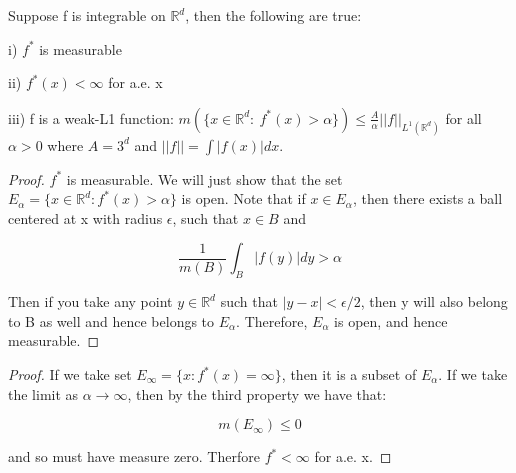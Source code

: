 \documentclass[class=article, crop=false]{standalone}
\begin{document}
			\begin{theorem} 
			\label{thm:properties_hardylittlewood_maximal_function}
				Suppose f is integrable on $\mathbb{R}^d$, then the following are true:

					i) $f^*$ is measurable

					ii) $f^*(x) < \infty$ for a.e. x

					iii) f is a weak-L1 function: $m(\{x \in \mathbb{R}^d: \ f^*(x) > \alpha \}) \le \frac{A}{\alpha} ||f||_{L^1(\mathbb{R}^d)}$ for all $\alpha > 0$ where $A = 3^d$ and $||f|| = \int |f(x)| dx$.
			\end{theorem}
			\begin{proof}
				$f^*$ is measurable. We will just show that the set $E_\alpha = \{x \in \mathbb{R}^d : f^*(x) > \alpha\}$ is open. Note that if $x \in E_\alpha$, then there exists a ball centered at x with radius $\epsilon$, such that $x \in B$ and 

					$$\frac{1}{m(B)} \int_B |f(y)| dy > \alpha$$

				Then if you take any point $y \in \mathbb{R}^d$ such that $|y - x| < \epsilon / 2$, then y will also belong to B as well and hence belongs to $E_\alpha$. Therefore, $E_\alpha$ is open, and hence measurable. 
			\end{proof}
			\begin{proof}
				If we take set $E_\infty = \{x : f^*(x) = \infty \}$, then it is a subset of $E_\alpha$. If we take the limit as $\alpha \rightarrow \infty$, then by the third property we have that:

					$$m(E_\infty) \le 0$$
				 
				and so must have measure zero. Therfore $f^* < \infty$ for a.e. x.
			\end{proof}
\end{document}
